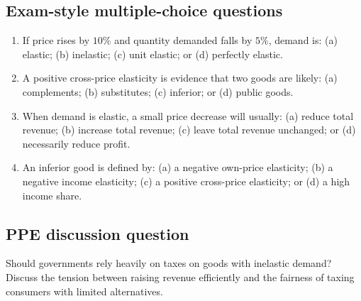 \subsection*{Exam-style multiple-choice questions}
\begin{enumerate}[resume,label=\arabic*.]
  \item If price rises by $10\%$ and quantity demanded falls by $5\%$, demand is: (a) elastic; (b) inelastic; (c) unit elastic; or (d) perfectly elastic.
  \item A positive cross-price elasticity is evidence that two goods are likely: (a) complements; (b) substitutes; (c) inferior; or (d) public goods.
  \item When demand is elastic, a small price decrease will usually: (a) reduce total revenue; (b) increase total revenue; (c) leave total revenue unchanged; or (d) necessarily reduce profit.
  \item An inferior good is defined by: (a) a negative own-price elasticity; (b) a negative income elasticity; (c) a positive cross-price elasticity; or (d) a high income share.
\end{enumerate}

\subsection*{PPE discussion question}

\noindent Should governments rely heavily on taxes on goods with inelastic demand? Discuss the tension between raising revenue efficiently and the fairness of taxing consumers with limited alternatives.
